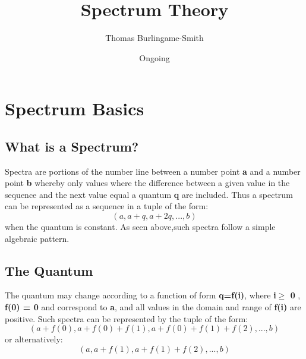 \documentclass[12pt]{scrreprt}
\title{Spectrum Theory}
\author{Thomas Burlingame-Smith}
\date{Ongoing}
\begin{document}
\maketitle
\chapter{Spectrum Basics}
\section{What is a Spectrum?}
          Spectra are portions of the number line between a number point \textbf{a} and a number point \textbf{b} whereby only values where the difference between a given value in the sequence and the next value equal a quantum \textbf{q} are included.
Thus a spectrum can be represented as a sequence in a tuple of the form:
                                                                                            \begin{equation}  (a,a+q,a+2q,...,b)\end{equation}
when the quantum is constant. As seen above,such spectra follow a simple algebraic pattern.  
\section{The Quantum}
	The quantum may change according to a function of form \textbf{q=f(i)}, where\textbf{ i$ \geq$ 0} ,\textbf{ f(0) = 0} and correspond to \textbf{a}, and all values in the domain and range of \textbf{f(i)} are positive. Such spectra can be represented by the tuple of the form:
                                                                                                   \begin{equation}  (a+f(0),a+f(0)+f(1),a+f(0)+f(1)+f(2),...,b)\end{equation}
or alternatively:
                                                                                                    \begin{equation}  (a,a+f(1),a+f(1)+f(2),...,b)\end{equation}
\end{document}

